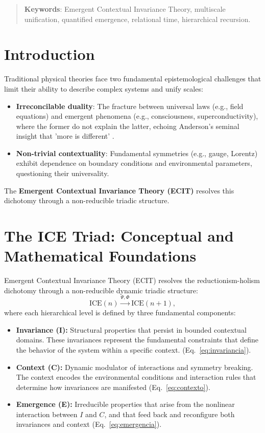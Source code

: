 \documentclass{article}
\begin{document}
\begin{abstract}
\textbf{Keywords}: Emergent Contextual Invariance Theory, multiscale unification, quantified emergence, relational time, hierarchical recursion.\end{abstract}

\section{Introduction}\label{sec:intro}
Traditional physical theories face two fundamental epistemological challenges that limit their ability to describe complex systems and unify scales:

\begin{itemize}
    \item \textbf{Irreconcilable duality}: The fracture between universal laws (e.g., field equations) and emergent phenomena (e.g., consciousness, superconductivity), where the former do not explain the latter, echoing Anderson's seminal insight that 'more is different' \cite{Anderson1972}.
    \item \textbf{Non-trivial contextuality}: Fundamental symmetries (e.g., gauge, Lorentz) exhibit dependence on boundary conditions and environmental parameters, questioning their universality.
\end{itemize}

The \textbf{Emergent Contextual Invariance Theory (ECIT)} resolves this dichotomy through a non-reducible triadic structure.

\section{The ICE Triad: Conceptual and Mathematical Foundations}
Emergent Contextual Invariance Theory (ECIT) resolves the reductionism-holism dichotomy through a non-reducible dynamic triadic structure:
\begin{equation}\label{eq:ICE}
    \text{ICE}(n) \xrightarrow{\Psi,\Phi} \text{ICE}(n+1),
\end{equation}
where each hierarchical level is defined by three fundamental components:

\begin{itemize}
    \item \textbf{Invariance (I):} Structural properties that persist in bounded contextual domains. These invariances represent the fundamental constraints that define the behavior of the system within a specific context. (Eq.~\ref{eq:invariancia}).

    \item \textbf{Context (C):} Dynamic modulator of interactions and symmetry breaking. The context encodes the environmental conditions and interaction rules that determine how invariances are manifested (Eq.~\ref{eq:contexto}).

    \item \textbf{Emergence (E):} Irreducible properties that arise from the nonlinear interaction between $I$ and $C$, and that feed back and reconfigure both invariances and context (Eq.~\ref{eq:emergencia}).
\end{itemize}
\end{document}

